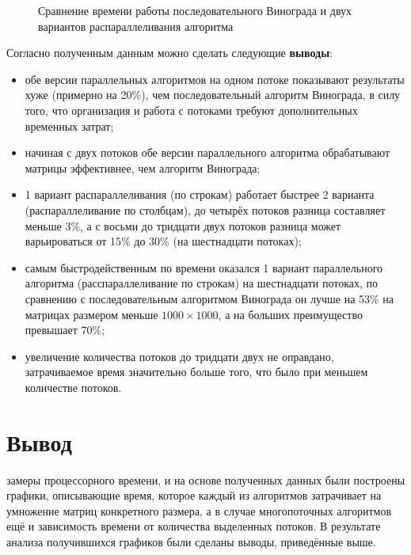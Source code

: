 \begin{figure}[h]
\caption{Сравнение времени работы последовательного Винограда и двух вариантов распараллеливания алгоритма}
\label{fig6:graph}
\end{figure}

\newpage

Согласно полученным данным можно сделать следующие \textbf{выводы}:
\begin{itemize}
	\item обе версии параллельных алгоритмов на одном потоке показывают результаты хуже (примерно на 20\%), чем последовательный алгоритм Винограда, в силу того, что организация и работа с потоками требуют дополнительных временных затрат;
	\item начиная с двух потоков обе версии параллельного алгоритма обрабатывают матрицы эффективнее, чем алгоритм Винограда;
	\item 1 вариант распараллеливания (по строкам) работает быстрее 2 варианта (распараллеливание по столбцам), до четырёх потоков разница составляет меньше 3\%, а с восьми до тридцати двух потоков разница может варьироваться от 15\% до 30\% (на шестнадцати потоках);
	\item самым быстродейственным по времени оказался 1 вариант параллельного алгоритма (расспараллеливание по строкам) на шестнадцати потоках, по сравнению с последовательным алгоритмом Винограда он лучше на 53\% на матрицах размером меньше $1000 \times 1000$, а на больших преимущество превышает 70\%;
	\item увеличение количества потоков до тридцати двух не оправдано, затрачиваемое время значительно больше того, что было при меньшем количестве потоков.
	\end{itemize}

\section*{Вывод}
 замеры процессорного времени, и на основе полученных данных были построены графики, описывающие время, которое каждый из алгоритмов затрачивает на умножение матриц конкретного размера, а в случае многопоточных алгоритмов ещё и зависимость времени от количества выделенных потоков. В результате анализа получившихся графиков были сделаны выводы, приведённые выше.


